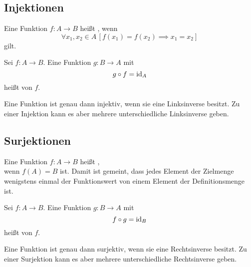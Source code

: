 \subsection{Injektionen}
\begin{definition}[Injektion]\mbox{}\newline
Eine Funktion $f\colon A\to B$ heißt ,
wenn
\begin{equation}
\forall x_1,x_2\in A\,[f(x_1)=f(x_2)\implies x_1=x_2]
\end{equation}
gilt.
\end{definition}

\begin{definition}[Linksinverse]\mbox{}\newline
Sei $f\colon A\to B$. Eine Funktion $g\colon B\to A$ mit
\begin{equation}
g\circ f = \operatorname{id}_A
\end{equation}
heißt  von $f$.
\end{definition}
Eine Funktion ist genau dann injektiv, wenn sie eine Linksinverse
besitzt. Zu einer Injektion kann es aber mehrere unterschiedliche
Linksinverse geben.

\subsection{Surjektionen}
\begin{definition}[Surjektion]\mbox{}\newline
Eine Funktion $f\colon A\to B$ heißt ,\\
wenn $f(A)=B$ ist. Damit ist gemeint, dass jedes Element
der Zielmenge wenigstens einmal der Funktionswert von einem
Element der Definitionsmenge ist.
\end{definition}

\begin{definition}[Rechtsinverse]\mbox{}\newline
Sei $f\colon A\to B$. Eine Funktion $g\colon B\to A$ mit
\begin{equation}
f\circ g = \operatorname{id}_B
\end{equation}
heißt  von $f$.
\end{definition}
Eine Funktion ist genau dann surjektiv, wenn sie eine Rechtsinverse
besitzt. Zu einer Surjektion kann es aber mehrere unterschiedliche
Rechtsinverse geben.

